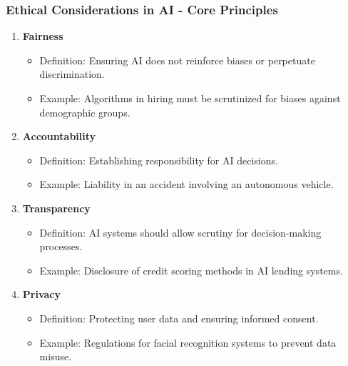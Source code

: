 \documentclass[aspectratio=169]{beamer}
\begin{document}
\begin{frame}[fragile]
    \frametitle{Ethical Considerations in AI - Core Principles}
    \begin{enumerate}
        \item \textbf{Fairness}
            \begin{itemize}
                \item Definition: Ensuring AI does not reinforce biases or perpetuate discrimination.
                \item Example: Algorithms in hiring must be scrutinized for biases against demographic groups.
            \end{itemize}
        \item \textbf{Accountability}
            \begin{itemize}
                \item Definition: Establishing responsibility for AI decisions.
                \item Example: Liability in an accident involving an autonomous vehicle.
            \end{itemize}
        \item \textbf{Transparency}
            \begin{itemize}
                \item Definition: AI systems should allow scrutiny for decision-making processes.
                \item Example: Disclosure of credit scoring methods in AI lending systems.
            \end{itemize}
        \item \textbf{Privacy}
            \begin{itemize}
                \item Definition: Protecting user data and ensuring informed consent.
                \item Example: Regulations for facial recognition systems to prevent data misuse.
            \end{itemize}
    \end{enumerate}
\end{frame}
\end{document}

